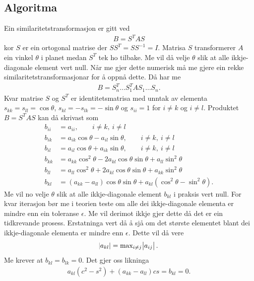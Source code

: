 \documentclass[11pt, a4paper]{article}
\begin{document}
\subsection{Algoritma}
    Ein similaritetstransformasjon er gitt ved 
    \begin{align*}
      B = S^TAS
    \end{align*}
    kor $S$ er ein ortogonal matrise der $SS^T = SS^{-1} = I$. Matrisa $S$ transformerer $A$ ein vinkel $\theta$ i planet medan $S^T$ tek ho tilbake.
    Me vil då velje $\theta$ slik at alle ikkje-diagonale element vert null. Når me gjer dette numerisk må me gjere ein rekke similaritetstransformasjonar 
    for å oppnå dette. Då har me
    \begin{align*}
      B = S_n^T \dots S_1^TAS_1 \dots S_n.
    \end{align*}
    Kvar matrise $S$ og $S^T$ er identitetsmatrisa med unntak av elementa $s_{kk} = s_{ll} = \cos{\theta}$, $s_{kl} = -s_{lk} = -\sin{\theta}$ og 
    $s_{ii} = 1$ for $i \ne k$ og $i \ne l$. Produktet $B = S^TAS$ kan då skrivast som
    \begin{align*}
      b_{ii} &= a_{ii}, \qquad i \ne k, \ i \ne l \\
      b_{ik} &= a_{ik}\cos{\theta} - a_{il}\sin{\theta}, \qquad i \ne k, \ i \ne l \\
      b_{il} &= a_{il}\cos{\theta} + a_{ik}\sin{\theta}, \qquad i \ne k, \ i \ne l \\
      b_{kk} &= a_{kk}\cos^2{\theta} - 2a_{kl}\cos{\theta}\sin{\theta} + a_{ll}\sin^2{\theta} \\
      b_{ll} &= a_{ll}\cos^2{\theta} + 2a_{kl}\cos{\theta}\sin{\theta} + a_{kk}\sin^2{\theta} \\
      b_{kl} &= (a_{kk} - a_{ll})\cos{\theta}\sin{\theta} + a_{kl}(\cos^2{\theta} - \sin^2{\theta}).
    \end{align*}
    Me vil no velje $\theta$ slik at alle ikkje-diagonale element $b_{kl}$ i praksis vert null. For kvar iterasjon bør me i teorien teste om alle
    dei ikkje-diagonale elementa er mindre enn ein toleranse $\epsilon$. Me vil derimot ikkje gjer dette då det er ein tidkrevande prosess. 
    Erstatninga vert då å sjå om det største elementet blant dei ikkje-diagonale elementa er mindre enn $\epsilon$. Dette vil då vere
    \begin{align*}
      \abs{a_{kl}} = \text{max}_{i \ne j}\abs{a_{ij}}.
    \end{align*}
    Me krever at $b_{kl} = b_{lk} = 0$. Det gjer oss likninga
    \begin{align}
      a_{kl}(c^2 - s^2) + (a_{kk} - a_{ll})cs = b_{kl} = 0.
    \end{align}
\end{document}
